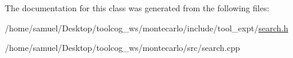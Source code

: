 The documentation for this class was generated from the following files\+:\begin{DoxyCompactItemize}
\item 
/home/samuel/\+Desktop/toolcog\+\_\+ws/montecarlo/include/tool\+\_\+expt/\hyperlink{search_8h}{search.\+h}\item 
/home/samuel/\+Desktop/toolcog\+\_\+ws/montecarlo/src/search.\+cpp\end{DoxyCompactItemize}

